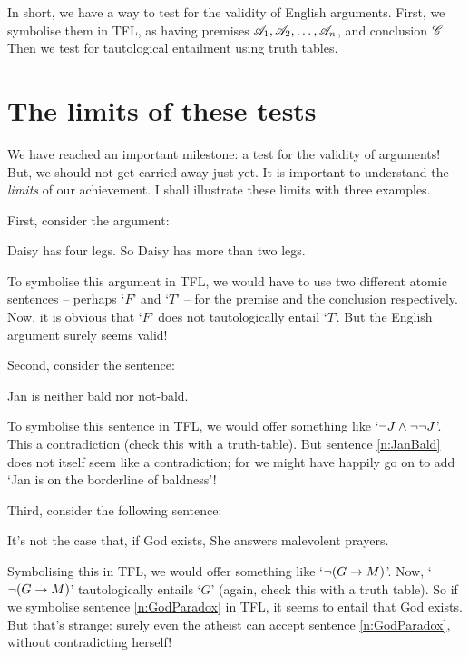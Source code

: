 In short, we have a way to test for the validity of English arguments. First, we symbolise them in TFL, as having premises $\mathscr{A}_1, \mathscr{A}_2, \ldots, \mathscr{A}_n$, and conclusion $\mathscr{C}$. Then we test for tautological entailment using truth tables. 


\section{The limits of these tests}\label{s:ParadoxesOfMaterialConditional}
We have reached an important milestone: a test for the validity of arguments! But, we should not get carried away just yet. It is important to understand the \emph{limits} of our achievement. I shall illustrate these limits with three examples.

First, consider the argument: 
	\begin{earg}
		\item Daisy has four legs. So Daisy has more than two legs.
	\end{earg}
To symbolise this argument in TFL, we would have to use two different atomic sentences -- perhaps `$F$'  and `$T$' -- for the premise and the conclusion respectively. Now, it is obvious that `$F$' does not tautologically entail `$T$'. But the English argument surely seems valid!

Second, consider the sentence:
	\begin{earg}
\setcounter{eargnum}{1}
		\item\label{n:JanBald} Jan is neither bald nor not-bald.
	\end{earg}
To symbolise this sentence in TFL, we would offer something like `$\neg J \wedge \neg \neg J$'. This a contradiction (check this with a truth-table). But sentence \ref{n:JanBald} does not itself seem like a contradiction; for we might have happily go on to add `Jan is on the borderline of baldness'!

Third, consider the following sentence:
	\begin{earg}
\setcounter{eargnum}{2}	
		\item\label{n:GodParadox}	It's not the case that, if God exists, She answers malevolent prayers.
	\end{earg}
Symbolising this in TFL, we would offer something like `$\neg (G \rightarrow M)$'. Now, `$\neg (G \rightarrow M)$' tautologically entails `$G$' (again, check this with a truth table). So if we symbolise sentence \ref{n:GodParadox} in TFL, it seems to entail that God exists. But that's strange: surely even the atheist can accept sentence \ref{n:GodParadox}, without contradicting herself!

